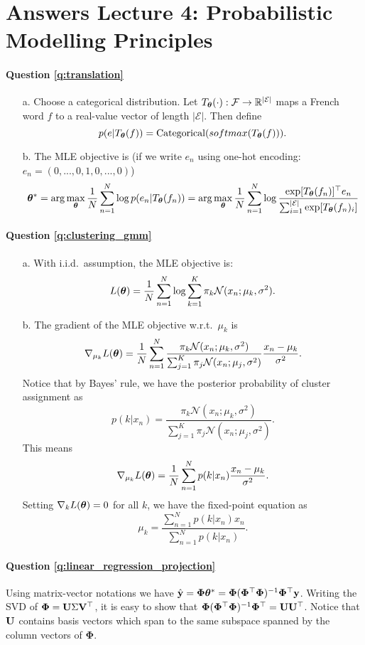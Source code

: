 \section{Answers Lecture 4: Probabilistic Modelling Principles}

\paragraph{Question \ref{q:translation}}
\begin{itemize}
    \item[a.] Choose a categorical distribution. Let $T_{\bm{\theta}}(\cdot): \mathcal{F} \rightarrow \mathbb{R}^{|\mathcal{E}|}$ maps a French word $f$ to a real-value vector of length $|\mathcal{E}|$. Then define
    $$p(e | T_{\bm{\theta}}(f)) = \text{Categorical}(softmax(T_{\bm{\theta}}(f))).$$
    \item[b.] The MLE objective is (if we write $e_n$ using one-hot encoding: $e_n = (0, ..., 0, 1, 0, ..., 0)$)
    $$\bm{\theta}^* = \arg\max_{\bm{\theta}} \frac{1}{N} \sum_{n=1}^N \log p(e_n | T_{\bm{\theta}}(f_n)) = \arg\max_{\bm{\theta}} \frac{1}{N} \sum_{n=1}^N \log \frac{\exp[T_{\bm{\theta}}(f_n)]^\top e_n}{\sum_{i=1}^{|\mathcal{E}|} \exp[T_{\bm{\theta}}(f_n)_i] }$$
\end{itemize}

\paragraph{Question \ref{q:clustering_gmm}}
\begin{itemize}
    \item[a.] With i.i.d.~assumption, the MLE objective is:
    $$L(\bm{\theta}) = \frac{1}{N} \sum_{n=1}^N \log \sum_{k=1}^K \pi_k \mathcal{N}(x_n; \mu_k, \sigma^2).$$
    \item[b.] The gradient of the MLE objective w.r.t.~$\mu_k$ is
    $$\nabla_{\mu_k} L(\bm{\theta}) = \frac{1}{N} \sum_{n=1}^N \frac{\pi_k \mathcal{N}(x_n; \mu_k, \sigma^2)}{\sum_{j=1}^K \pi_j \mathcal{N}(x_n; \mu_j, \sigma^2) } \frac{x_n - \mu_k}{\sigma^2}.$$
    Notice that by Bayes' rule, we have the posterior probability of cluster assignment as
    $$p(k| x_n) = \frac{\pi_k \mathcal{N}(x_n; \mu_k, \sigma^2)}{\sum_{j=1}^K \pi_j \mathcal{N}(x_n; \mu_j, \sigma^2) }.$$
    This means
    $$\nabla_{\mu_k} L(\bm{\theta}) = \frac{1}{N} \sum_{n=1}^N p(k | x_n) \frac{x_n - \mu_k}{\sigma^2}.$$
    Setting $\nabla_{k} L(\bm{\theta}) = 0$ for all $k$, we have the fixed-point equation as
    $$\mu_k =  \frac{ \sum_{n=1}^N p(k | x_n) x_n}{\sum_{n=1}^N p(k | x_n) }.$$
\end{itemize}


\paragraph{Question \ref{q:linear_regression_projection}}
Using matrix-vector notations we have $\hat{\mathbf{y}} = \bm{\Phi} \bm{\theta}^* = \bm{\Phi} (\bm{\Phi}^\top \bm{\Phi})^{-1} \bm{\Phi}^\top \mathbf{y}$. Writing the SVD of $\bm{\Phi} = \mathbf{U} \Sigma \mathbf{V}^\top$, it is easy to show that $\bm{\Phi} (\bm{\Phi}^\top \bm{\Phi})^{-1} \bm{\Phi}^\top = \mathbf{U} \mathbf{U}^\top$. Notice that $\mathbf{U}$ contains basis vectors which span to the same subspace spanned by the column vectors of $\bm{\Phi}$.